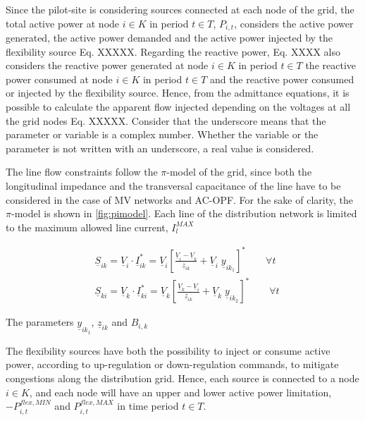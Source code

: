Since the pilot-site is considering sources connected at each node of the grid, the total active power at node $i \in K$ in period $t \in T$, $P_{i,t}$, considers the active power generated, the active power demanded and the active power injected by the flexibility source Eq. XXXXX. Regarding the reactive power, Eq. XXXX also considers the reactive power generated at node  $i \in K$ in period $t \in T$ the reactive power consumed at node $i \in K$ in period $t \in T$ and the reactive power consumed or injected by the flexibility source.
Hence, from the admittance equations, it is possible to calculate the apparent flow injected depending on the voltages at all the grid nodes Eq. XXXXX. Consider that the underscore means that the parameter or variable is a complex number. Whether the variable or the parameter is not written with an underscore, a real value is considered.

The line flow constraints follow the $\pi$-model of the grid, since both the longitudinal impedance and the transversal capacitance of the line have to be considered in the case of MV networks and AC-OPF. For the sake of clarity, the $\pi$-model is shown in \ref{fig:pimodel}. Each line of the distribution network is limited to the maximum allowed line current, $I_{l}^{MAX}$


\begin{subequations}
\begin{align*}
& \underline{S}_{ik} = \underline{V}_{i} \cdot \underline{I}_{ik}^{*} = \underline{V}_{i} \left[ \frac{\underline{V}_{i} - \underline{V}_{k}}{\underline{z}_{ik}} + \underline{V}_{i} \; \underline{y}_{ik_1} \right]^{*}   \qquad  \forall t  \\
& \underline{S}_{ki} = \underline{V}_{k} \cdot \underline{I}_{ki}^{*} = \underline{V}_{k} \left[ \frac{\underline{V}_{k} - \underline{V}_{i}}{\underline{z}_{ik}} + \underline{V}_{k} \;  \underline{y}_{ik_2} \right]^{*}   \qquad  \forall t  
\end{align*}
\end{subequations}

The parameters $\underline{y}_{ik_1}$,  $\underline{z}_{ik}$ and $B_{i,k}$

The flexibility sources have both the possibility to inject or consume active power, according to up-regulation or down-regulation commands, to mitigate congestions along the distribution grid. Hence, each source is connected to a node $i \in K$, and each node will have an upper and lower active power limitation, $-P_{i,t}^{flex,MIN}$ and $P_{i,t}^{flex,MAX}$  in time period $t \in T$.

